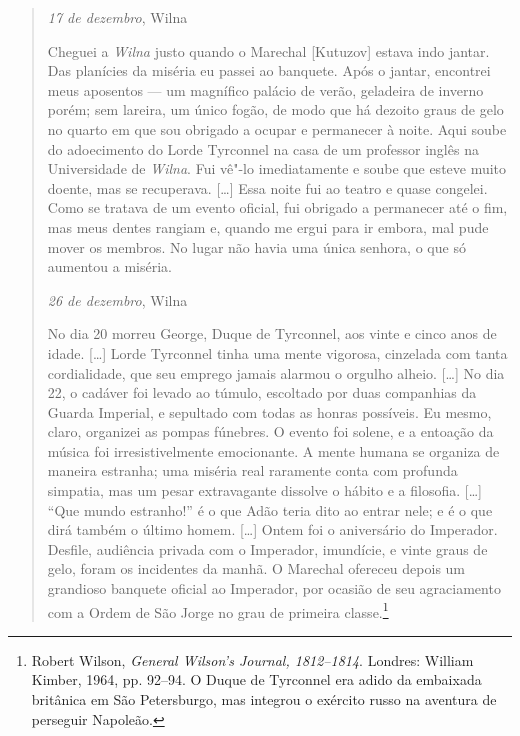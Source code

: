 \begin{quote}

\begin{flushright}
\textit{17 de dezembro}, Wilna
\end{flushright}
\smallskip

Cheguei a \textit{Wilna} justo quando o Marechal {[}Kutuzov{]} estava indo
jantar. Das planícies da miséria eu passei ao banquete. Após o jantar,
encontrei meus aposentos --- um magnífico palácio de verão, geladeira de
inverno porém; sem lareira, um único fogão, de modo que há dezoito graus
de gelo no quarto em que sou obrigado a ocupar e permanecer à noite.
Aqui soube do adoecimento do Lorde Tyrconnel na casa de um professor
inglês na Universidade de \textit{Wilna}. Fui vê"-lo imediatamente e soube que
esteve muito doente, mas se recuperava. [\ldots{}] Essa noite fui ao
teatro e quase congelei. Como se tratava de um evento oficial, fui
obrigado a permanecer até o fim, mas meus dentes rangiam e, quando me
ergui para ir embora, mal pude mover os membros. No lugar não havia uma
única senhora, o que só aumentou a miséria.

\medskip

\begin{flushright}
\textit{26 de dezembro}, Wilna
\end{flushright}

No dia 20 morreu George, Duque de Tyrconnel, aos vinte e cinco anos de
idade. [\ldots{}] Lorde Tyrconnel tinha uma mente vigorosa, cinzelada com
tanta cordialidade, que seu emprego jamais alarmou o orgulho alheio.
[\ldots{}] No dia 22, o cadáver foi levado ao túmulo, escoltado por duas
companhias da Guarda Imperial, e sepultado com todas as honras
possíveis. Eu mesmo, claro, organizei as pompas fúnebres. O evento foi
solene, e a entoação da música foi irresistivelmente emocionante. A
mente humana se organiza de maneira estranha; uma miséria real raramente
conta com profunda simpatia, mas um pesar extravagante dissolve o hábito
e a filosofia. [\ldots{}] ``Que mundo estranho!'' é o que Adão teria dito
ao entrar nele; e é o que dirá também o último homem. [\ldots{}] Ontem foi
o aniversário do Imperador. Desfile, audiência privada com o Imperador,
imundície, e vinte graus de gelo, foram os incidentes da manhã. O
Marechal ofereceu depois um grandioso banquete oficial ao Imperador, por
ocasião de seu agraciamento com a Ordem de São Jorge no grau de primeira
classe.\footnote{Robert Wilson, \textit{General Wilson's Journal, 1812--1814}. Londres: William Kimber, 1964, pp. 92--94. O Duque de Tyrconnel era adido da embaixada britânica em São Petersburgo, mas integrou o exército russo na aventura de perseguir Napoleão.} 
\end{quote}

